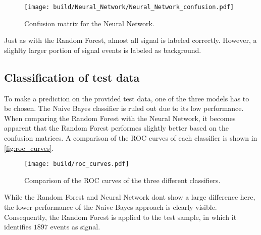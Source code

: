\begin{figure}[H]
  \centering
  \texttt{[image: build/Neural\_Network/Neural\_Network\_confusion.pdf]}
  \caption{Confusion matrix for the Neural Network.}
  \label{fig:NeuralNetwork_confusion}
\end{figure}

Just as with the Random Forest, almost all signal is labeled correctly.
However, a slighlty larger portion of signal events is labeled as background.

\subsection{Classification of test data}

To make a prediction on the provided test data, one of the three models has
to be chosen. The Naive Bayes classifier is ruled out due to its low performance.
When comparing the Random Forest with the Neural Network, it becomes apparent that
the Random Forest performes slightly better based on the confusion matrices.
A comparison of the ROC curves of each classifier is shown in \autoref{fig:roc_curves}.

\begin{figure}[H]
  \centering
  \texttt{[image: build/roc\_curves.pdf]}
  \caption{Comparison of the ROC curves of the three different classifiers.}
  \label{fig:roc_curves}
\end{figure}

While the Random Forest and Neural Network dont show a large difference here, the
lower performance of the Naive Bayes approach is clearly visible.
Consequently, the Random Forest is applied to the test sample, in which it
identifies $1897$ events as signal.